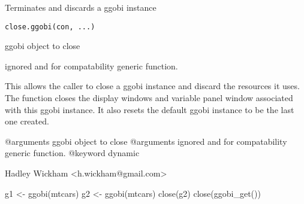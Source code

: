 \begin{Description}\relax
Terminates and discards a ggobi instance
\end{Description}
\begin{Usage}
\begin{verbatim}close.ggobi(con, ...)\end{verbatim}
\end{Usage}
\begin{Arguments}
\begin{ldescription}
\item[\code{con}] ggobi object to close
\item[\code{...}] ignored and for compatability generic function.
\end{ldescription}
\end{Arguments}
\begin{Details}\relax
This allows the caller to close a ggobi instance and discard the
resources it uses. The function closes the display windows and
variable panel window associated with this ggobi instance.
It also resets the default ggobi instance to be the last
one created.

@arguments ggobi object to close
@arguments ignored and for compatability generic function.
@keyword dynamic
\end{Details}
\begin{Author}\relax
Hadley Wickham <h.wickham@gmail.com>
\end{Author}
\begin{Examples}
\begin{ExampleCode}g1 <- ggobi(mtcars)
g2 <- ggobi(mtcars)
close(g2)
close(ggobi_get())\end{ExampleCode}
\end{Examples}

